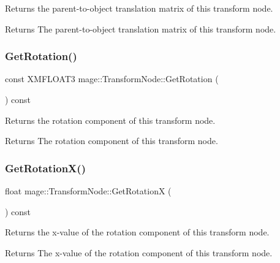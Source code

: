 Returns the parent-\/to-\/object translation matrix of this transform node.

\begin{DoxyReturn}{Returns}
The parent-\/to-\/object translation matrix of this transform node. 
\end{DoxyReturn}
\hypertarget{classmage_1_1_transform_node_a59853c7e8a8cd049a8e6362986204409}{}\label{classmage_1_1_transform_node_a59853c7e8a8cd049a8e6362986204409} 
\subsubsection{\texorpdfstring{Get\+Rotation()}{GetRotation()}}
{\footnotesize\ttfamily const X\+M\+F\+L\+O\+A\+T3 mage\+::\+Transform\+Node\+::\+Get\+Rotation (\begin{DoxyParamCaption}{ }\end{DoxyParamCaption}) const}

Returns the rotation component of this transform node.

\begin{DoxyReturn}{Returns}
The rotation component of this transform node. 
\end{DoxyReturn}
\hypertarget{classmage_1_1_transform_node_a2b3d032c45a0de8d128db83664d85111}{}\label{classmage_1_1_transform_node_a2b3d032c45a0de8d128db83664d85111} 
\subsubsection{\texorpdfstring{Get\+Rotation\+X()}{GetRotationX()}}
{\footnotesize\ttfamily float mage\+::\+Transform\+Node\+::\+Get\+RotationX (\begin{DoxyParamCaption}{ }\end{DoxyParamCaption}) const}

Returns the x-\/value of the rotation component of this transform node.

\begin{DoxyReturn}{Returns}
The x-\/value of the rotation component of this transform node. 
\end{DoxyReturn}
\hypertarget{classmage_1_1_transform_node_ab8e8e698297793281a7c880bdcde3880}{}\label{classmage_1_1_transform_node_ab8e8e698297793281a7c880bdcde3880} 
